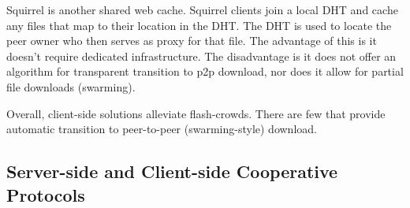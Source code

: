 Squirrel \cite{squirrel} is another shared web cache.  Squirrel clients join a local DHT and cache any files that 
map to their location in the DHT.  The DHT is used to locate the peer owner who then serves as proxy for that file.  The advantage of this is it doesn't 
require dedicated infrastructure.  The disadvantage is it does not offer an algorithm for transparent transition to p2p download, nor does it allow for 
partial file downloads (swarming).


Overall, client-side solutions alleviate flash-crowds. There are few that provide automatic transition to peer-to-peer (swarming-style) download.

\subsection{Server-side and Client-side Cooperative Protocols}


